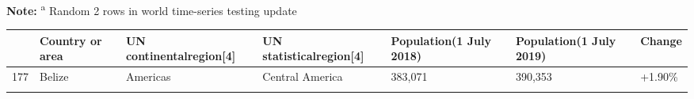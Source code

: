 \documentclass[
  11pt,
]{article}
\begin{document}
\textbf{Note:} \textsuperscript{a} Random 2 rows in world time-series
testing update

\begin{longtable}[]{@{}lllllll@{}}
\toprule
\begin{minipage}[b]{0.03\columnwidth}\raggedright
\strut
\end{minipage} & \begin{minipage}[b]{0.11\columnwidth}\raggedright
Country or area\strut
\end{minipage} & \begin{minipage}[b]{0.16\columnwidth}\raggedright
UN continentalregion{[}4{]}\strut
\end{minipage} & \begin{minipage}[b]{0.16\columnwidth}\raggedright
UN statisticalregion{[}4{]}\strut
\end{minipage} & \begin{minipage}[b]{0.16\columnwidth}\raggedright
Population(1 July 2018)\strut
\end{minipage} & \begin{minipage}[b]{0.16\columnwidth}\raggedright
Population(1 July 2019)\strut
\end{minipage} & \begin{minipage}[b]{0.05\columnwidth}\raggedright
Change\strut
\end{minipage}\tabularnewline
\midrule
\endhead
\begin{minipage}[t]{0.03\columnwidth}\raggedright
177\strut
\end{minipage} & \begin{minipage}[t]{0.11\columnwidth}\raggedright
Belize\strut
\end{minipage} & \begin{minipage}[t]{0.16\columnwidth}\raggedright
Americas\strut
\end{minipage} & \begin{minipage}[t]{0.16\columnwidth}\raggedright
Central America\strut
\end{minipage} & \begin{minipage}[t]{0.16\columnwidth}\raggedright
383,071\strut
\end{minipage} & \begin{minipage}[t]{0.16\columnwidth}\raggedright
390,353\strut
\end{minipage} & \begin{minipage}[t]{0.05\columnwidth}\raggedright
+1.90\%\strut
\end{minipage}\tabularnewline
\begin{minipage}[t]{0.03\columnwidth}\raggedright

\end{minipage}
\end{longtable}
\end{document}
